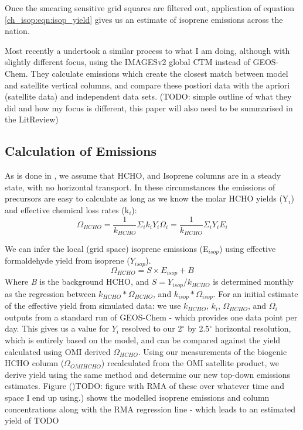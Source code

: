     Once the smearing sensitive grid squares are filtered out, application of equation \ref{ch_isop:eqn:isop_yield} gives us an estimate of isoprene emissions across the nation.
    
    Most recently a \citet{Bauwens2016} undertook a similar process to what I am doing, although with slightly different focus, using the IMAGESv2 global CTM instead of GEOS-Chem.
    They calculate emissions which create the closest match between model and satellite vertical columns, and compare these postiori data with the apriori (satellite data) and independent data sets.
    (TODO: simple outline of what they did and how my focus is different, this paper will also need to be summarised in the LitReview)
    
  \subsection{Calculation of Emissions}
    \label{ch_isop:sec:EmissionCalculation}
    As is done in \citet{Palmer2003, Millet2006, Bauwens2016}, we assume that HCHO, and Isoprene columns are in a steady state, with no horizontal transport.
    In these circumstances the emissions of precursors are easy to calculate as long as we know the molar HCHO yields (Y$_i$) and effective chemical loss rates (k$_i$):
    \begin{equation}
      \Omega_{HCHO} = \frac{1}{k_{HCHO}}\Sigma_i k_i Y_i \Omega_i = \frac{1}{k_{HCHO}}\Sigma_i Y_i E_i
    \end{equation}
    
    We can infer the local (grid space) isoprene emissions (E$_{isop}$) using effective formaldehyde yield from isoprene ($Y_{isop}$).
    \begin{equation} \label{ch_isop:eqn:isop_yield}
      \Omega_{HCHO} = S \times E_{isop} + B
    \end{equation}
    Where \textit{B} is the background HCHO, and $S = Y_{isop}/k_{HCHO}$ is determined monthly as the regression between $k_{HCHO}*\Omega_{HCHO}$, and $k_{isop}*\Omega_{isop}$.
    For an initial estimate of the effective yield from simulated data: we use $k_{HCHO}$, $k_{i}$, $\Omega_{HCHO}$, and $\Omega_i$ outputs from a standard run of GEOS-Chem - which provides one data point per day.
    This gives us a value for $Y_i$ resolved to our 2$^{\circ}$ by 2.5$^{\circ}$ horizontal resolution, which is entirely based on the model, and can be compared against the yield calculated using OMI derived $\Omega_{HCHO}$.
    Using our measurements of the biogenic HCHO column ($\Omega_{OMIHCHO}$) recalculated from the OMI satellite product, we derive yield using the same method and determine our new top-down emissions estimates.
    Figure ()TODO: figure with RMA of these over whatever time and space I end up using.) shows the modelled isoprene emissions and column concentrations along with the RMA regression line - which leads to an estimated yield of TODO
    
